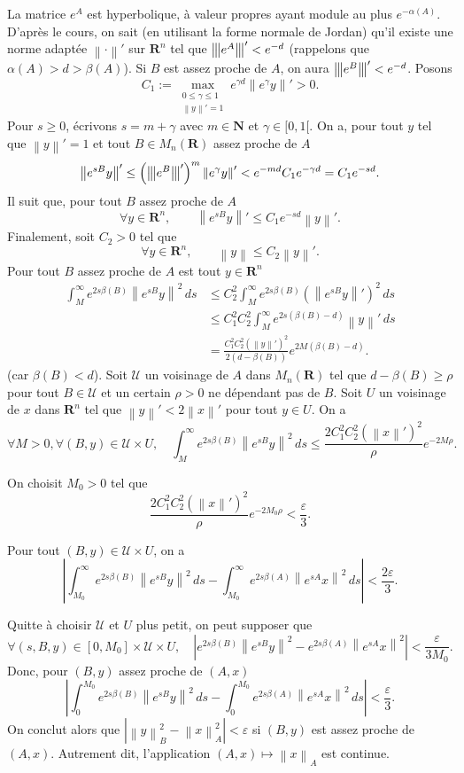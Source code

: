 \documentclass[french, 12pt]{article}
\theoremstyle{definition}
\newcommand{\tuple}[1]{\left(#1\right)}
\newcommand{\abs}[1]{\left|#1\right|}
\newcommand{\norm}[1]{\left\|#1\right\|}
\newcommand{\triplenorm}[1]{{\left\vert\kern-0.25ex\left\vert\kern-0.25ex\left\vert #1 \right\vert\kern-0.25ex\right\vert\kern-0.25ex\right\vert}}
\newcommand{\Nbb}{\mathbf{N}}
\newcommand{\Rbb}{\mathbf{R}}
\newcommand{\Ucal}{\mathcal{U}}
\begin{document}
\begin{enumerate}
   La matrice $e^{A}$ est hyperbolique, \`a valeur propres ayant module au plus $e^{-\alpha(A)}$. D'apr\`es le cours, on sait (en utilisant la forme normale de Jordan) qu'il existe une norme adapt\'ee $\norm{\cdot }'$ sur $\Rbb^n$ tel que $\triplenorm{e^A}' < e^{-d}$ (rappelons que $\alpha(A) > d > \beta(A)$). Si $B$ est assez proche de $A$, on aura $\triplenorm{e^B}' < e^{-d}$. Posons
        $$C_1 := \max_{\substack{0 \le \gamma \le 1 \\ \norm{y}' = 1}}e^{\gamma d}\norm{e^\gamma y}' > 0.$$
    Pour $s \ge 0$, \'ecrivons $s = m + \gamma$ avec $m \in \Nbb$ et $\gamma \in [0,1[$. On a, pour tout $y$ tel que $\norm{y}' = 1$ et tout $B \in M_n(\Rbb)$ assez proche de $A$
        $$\norm{e^{sB}y}' \le \tuple{\triplenorm{e^B}'}^m \norm{e^\gamma y}' < e^{-md}C_1e^{-\gamma d} = C_1e^{-sd}.$$
    Il suit que, pour tout $B$ assez proche de $A$
        $$\forall y \in \Rbb^n, \qquad \norm{e^{sB}y}' \le C_1e^{-sd}\norm{y}'.$$
    Finalement, soit $C_2 > 0$ tel que 
        $$\forall y \in \Rbb^n, \qquad \norm{y} \le C_2\norm{y}'.$$
   Pour tout $B$ assez proche de $A$ est tout $y \in \Rbb^n$
        \begin{align*}
            \int_M^\infty e^{2s\beta(B)} \norm{e^{sB}y}^2 \,ds & \le C_2^2\int_M^\infty e^{2s\beta(B)} \tuple{\norm{e^{sB}y}'}^2 \,ds \\
            & \le C_1^2C_2^2 \int_M^\infty e^{2s(\beta(B) - d)}\norm{y}'\,ds\\
            & = \frac{C_1^2C_2^2 (\norm{y}')^2}{2(d - \beta(B))}e^{2M(\beta(B) - d)}.
        \end{align*}
    (car $\beta(B) < d$). Soit $\Ucal$ un voisinage de $A$ dans $M_n(\Rbb)$ tel que $d - \beta(B) \ge \rho$ pour tout $B \in \Ucal$ et un certain $\rho > 0$ ne d\'ependant pas de $B$. Soit $U$ un voisinage de $x$ dans $\Rbb^n$ tel que $\norm{y}' < 2\norm{x}'$ pour tout $y \in U$. On a
        $$\forall M > 0, \forall (B,y) \in \Ucal \times U, \quad \int_M^\infty e^{2s\beta(B)} \norm{e^{sB}y}^2 \,ds \le \frac{2C_1^2C_2^2 (\norm{x}')^2}{\rho}e^{-2M\rho}.$$
        
    On choisit $M_0 > 0$ tel que
        $$\frac{2C_1^2C_2^2 (\norm{x}')^2}{\rho}e^{-2M_0\rho} < \frac{\varepsilon}{3}.$$
        
    Pour tout $(B,y) \in \Ucal \times U$, on a
        $$\abs{\int_{M_0}^\infty e^{2s\beta(B)} \norm{e^{sB}y}^2 \,ds  - \int_{M_0}^\infty e^{2s\beta(A)} \norm{e^{sA}x}^2 \,ds } < \frac{2\varepsilon}{3}.$$
        
    Quitte \`a choisir $\Ucal$ et $U$ plus petit, on peut supposer que
        $$\forall (s,B,y) \in [0,M_0] \times \Ucal \times U, \quad \abs{e^{2s\beta(B)}\norm{e^{sB}y}^2 - e^{2s\beta(A)}\norm{e^{sA}x}^2} < \frac{\varepsilon}{3M_0}.$$
    Donc, pour $(B,y)$ assez proche de $(A,x)$
        $$\abs{\int_0^{M_0}e^{2s\beta(B)}\norm{e^{sB}y}^2\,ds - \int_0^{M_0}e^{2s\beta(A)}\norm{e^{sA}x}^2 \,ds} < \frac{\varepsilon}{3}.$$
    On conclut alors que $\abs{\norm{y}_B^2 - \norm{x}_A^2} < \varepsilon$ si $(B,y)$ est assez proche de $(A,x)$. Autrement dit, l'application $(A,x) \mapsto \norm{x}_A$ est continue.
    


\end{enumerate}
\end{document}
